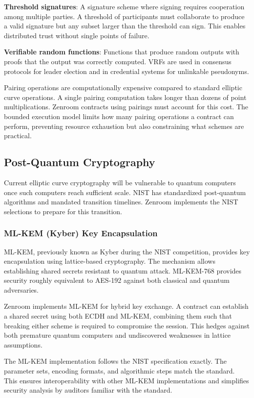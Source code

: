 \textbf{Threshold signatures}: A signature scheme where signing
requires cooperation among multiple parties. A threshold of
participants must collaborate to produce a valid signature but any
subset larger than the threshold can sign. This enables distributed
trust without single points of failure.

\textbf{Verifiable random functions}: Functions that produce random
outputs with proofs that the output was correctly computed. VRFs are
used in consensus protocols for leader election and in credential
systems for unlinkable pseudonyms.

Pairing operations are computationally expensive compared to standard
elliptic curve operations. A single pairing computation takes longer
than dozens of point multiplications. Zenroom contracts using pairings
must account for this cost. The bounded execution model limits how
many pairing operations a contract can perform, preventing resource
exhaustion but also constraining what schemes are practical.

\subsection{Post-Quantum Cryptography}

Current elliptic curve cryptography will be vulnerable to quantum
computers once such computers reach sufficient scale. NIST has
standardized post-quantum algorithms and mandated transition
timelines. Zenroom implements the NIST selections to prepare for this
transition.

\subsubsection{ML-KEM (Kyber) Key Encapsulation}

ML-KEM, previously known as Kyber during the NIST competition,
provides key encapsulation using lattice-based cryptography. The
mechanism allows establishing shared secrets resistant to quantum
attack. ML-KEM-768 provides security roughly equivalent to AES-192
against both classical and quantum adversaries.

Zenroom implements ML-KEM for hybrid key exchange. A contract can
establish a shared secret using both ECDH and ML-KEM, combining them
such that breaking either scheme is required to compromise the
session. This hedges against both premature quantum computers and
undiscovered weaknesses in lattice assumptions.

The ML-KEM implementation follows the NIST specification exactly. The
parameter sets, encoding formats, and algorithmic steps match the
standard. This ensures interoperability with other ML-KEM
implementations and simplifies security analysis by auditors familiar
with the standard.

